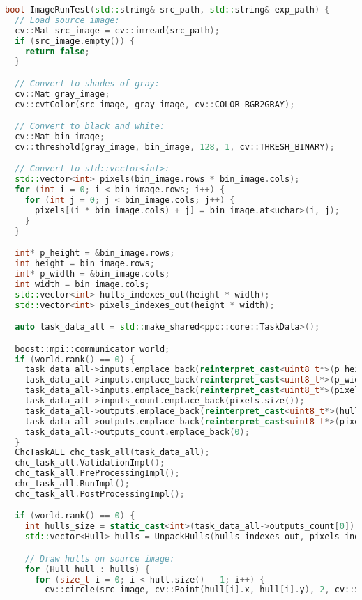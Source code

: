 \documentclass[12pt]{article}
\begin{document}
\begin{lstlisting}[language=C++, caption={Функция ImageRunTest() проверки корректности с помощью OpenCV}]
  bool ImageRunTest(std::string& src_path, std::string& exp_path) {
  // Load source image:
  cv::Mat src_image = cv::imread(src_path);
  if (src_image.empty()) {
    return false;
  }

  // Convert to shades of gray:
  cv::Mat gray_image;
  cv::cvtColor(src_image, gray_image, cv::COLOR_BGR2GRAY);

  // Convert to black and white:
  cv::Mat bin_image;
  cv::threshold(gray_image, bin_image, 128, 1, cv::THRESH_BINARY);

  // Convert to std::vector<int>:
  std::vector<int> pixels(bin_image.rows * bin_image.cols);
  for (int i = 0; i < bin_image.rows; i++) {
    for (int j = 0; j < bin_image.cols; j++) {
      pixels[(i * bin_image.cols) + j] = bin_image.at<uchar>(i, j);
    }
  }

  int* p_height = &bin_image.rows;
  int height = bin_image.rows;
  int* p_width = &bin_image.cols;
  int width = bin_image.cols;
  std::vector<int> hulls_indexes_out(height * width);
  std::vector<int> pixels_indexes_out(height * width);

  auto task_data_all = std::make_shared<ppc::core::TaskData>();

  boost::mpi::communicator world;
  if (world.rank() == 0) {
    task_data_all->inputs.emplace_back(reinterpret_cast<uint8_t*>(p_height));
    task_data_all->inputs.emplace_back(reinterpret_cast<uint8_t*>(p_width));
    task_data_all->inputs.emplace_back(reinterpret_cast<uint8_t*>(pixels.data()));
    task_data_all->inputs_count.emplace_back(pixels.size());
    task_data_all->outputs.emplace_back(reinterpret_cast<uint8_t*>(hulls_indexes_out.data()));
    task_data_all->outputs.emplace_back(reinterpret_cast<uint8_t*>(pixels_indexes_out.data()));
    task_data_all->outputs_count.emplace_back(0);
  }
  ChcTaskALL chc_task_all(task_data_all);
  chc_task_all.ValidationImpl();
  chc_task_all.PreProcessingImpl();
  chc_task_all.RunImpl();
  chc_task_all.PostProcessingImpl();

  if (world.rank() == 0) {
    int hulls_size = static_cast<int>(task_data_all->outputs_count[0]);
    std::vector<Hull> hulls = UnpackHulls(hulls_indexes_out, pixels_indexes_out, height, width, hulls_size);

    // Draw hulls on source image:
    for (Hull hull : hulls) {
      for (size_t i = 0; i < hull.size() - 1; i++) {
        cv::circle(src_image, cv::Point(hull[i].x, hull[i].y), 2, cv::Scalar(0, 0, 255), cv::FILLED);


\end{lstlisting}
\end{document}
